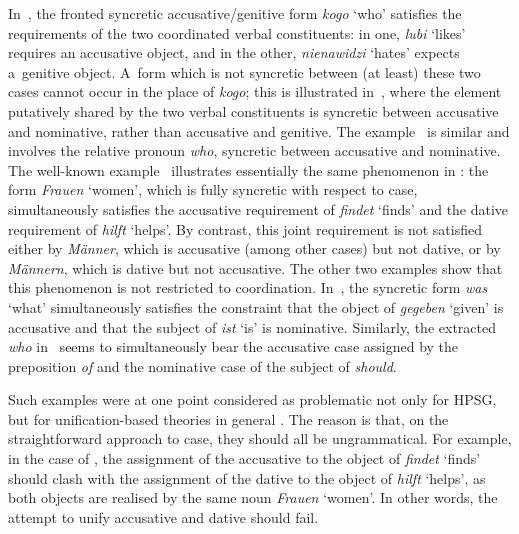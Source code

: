 \documentclass[output=paper]{langsci/langscibook}
\begin{document}
In~, the fronted syncretic accusative/genitive form \emph{kogo} ‘who’ satisfies the requirements of the two coordinated verbal constituents: in one, \emph{lubi} ‘likes’ requires an accusative object, and in the other, \emph{nienawidzi} ‘hates’ expects a~genitive object.  A~form which is not syncretic between (at least) these two cases cannot occur in the place of \emph{kogo}; this is illustrated in~, where the element putatively shared by the two verbal constituents is syncretic between accusative and nominative, rather than accusative and genitive.  The  example~ is similar and involves the relative pronoun \emph{who}, syncretic between accusative and nominative.  The well-known example~ illustrates essentially the same phenomenon in : the form \emph{Frauen} ‘women’, which is fully syncretic with respect to case, simultaneously satisfies the accusative requirement of \emph{findet} ‘finds’ and the dative requirement of \emph{hilft} ‘helps’.  By contrast, this joint requirement is not satisfied either by \emph{Männer}, which is accusative (among other cases) but not dative, or by \emph{Männern}, which is dative but not accusative.  The other two examples show that this phenomenon is not restricted to coordination.  In~, the syncretic form \emph{was} ‘what’ simultaneously satisfies the constraint that the object of \emph{gegeben} ‘given’ is accusative and that the subject of \emph{ist} ‘is’ is nominative.  Similarly, the extracted \emph{who} in~ seems to simultaneously bear the accusative case assigned by the preposition \emph{of} and the nominative case of the subject of \emph{should}.

Such examples were at one point considered as problematic not only for HPSG, but for unification-based theories in general \citep{Ingria90}.  The reason is that, on the straightforward approach to case, they should all be ungrammatical.  For example, in the case of , the assignment of the accusative to the object of \emph{findet} ‘finds’ should clash with the assignment of the dative to the object of \emph{hilft} ‘helps’, as both objects are realised by the same noun \emph{Frauen} ‘women’.  In other words, the attempt to unify accusative and dative should fail.  
\end{document}
